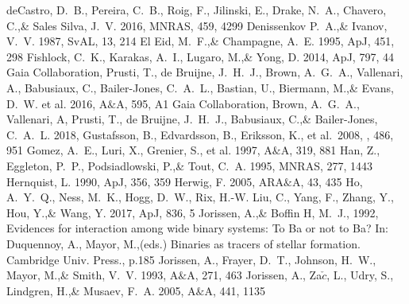 \documentclass[a4paper,fleqn,usenatbib]{mnras}
\begin{document}
\begin{thebibliography}{99}
deCastro, D.~B., Pereira, C.~B., Roig, F., Jilinski, E., Drake, N.~A., Chavero, C.,\& Sales Silva, J.~V. 2016, 
MNRAS, 459, 4299
Denissenkov P.~A.,\& Ivanov, V.~V. 1987, 
SvAL, 13, 214
El Eid, M.~F.,\& Champagne, A.~E. 1995, 
ApJ, 451, 298
Fishlock, C.~K., Karakas, A.~I., Lugaro, M.,\& Yong, D. 2014, 
ApJ, 797, 44
Gaia Collaboration, Prusti, T., de Bruijne, J.~H.~J., Brown, A.~G.~A., Vallenari, A., Babusiaux, C., Bailer-Jones, C.~A.~L., Bastian, U., Biermann, M.,\& Evans, D.~W. et al. 2016, 
A$\&$A, 595, A1
Gaia Collaboration, Brown, A.~G.~A., Vallenari, A, Prusti, T., de Bruijne, J.~H.~J., Babusiaux, C.,\& Bailer-Jones, C.~A.~L. 2018, 
 Gustafsson, B., Edvardsson, B., Eriksson, K., et al.\ 2008, \aap, 486, 951 
Gomez, A.~E., Luri, X., Grenier, S., et al. 1997, 
A$\&$A, 319, 881
Han, Z., Eggleton, P.~P., Podsiadlowski, P.,\& Tout, C.~A. 1995, 
MNRAS, 277, 1443
Hernquist, L. 1990, 
ApJ, 356, 359
Herwig, F. 2005, 
ARA$\&$A, 43, 435
Ho, A.~Y.~Q., Ness, M.~K., Hogg, D.~W., Rix, H.-W. Liu, C., Yang, F., Zhang, Y., Hou, Y.,\& Wang, Y. 2017, 
ApJ, 836, 5
Jorissen, A.,\& Boffin H, M.~J., 1992, 
Evidences for interaction among wide binary systems: To Ba or not to Ba? In: Duquennoy, A., Mayor, M.,(eds.) Binaries as tracers of stellar formation. Cambridge Univ. Press., p.185
Jorissen, A., Frayer, D.~T., Johnson, H.~W., Mayor, M.,\& Smith, V.~V. 1993, 
A$\&$A, 271, 463
Jorissen, A., Za$\check{c}$, L., Udry, S., Lindgren, H.,\& Musaev, F.~A. 2005, 
A$\&$A, 441, 1135

\end{thebibliography}
\end{document}
